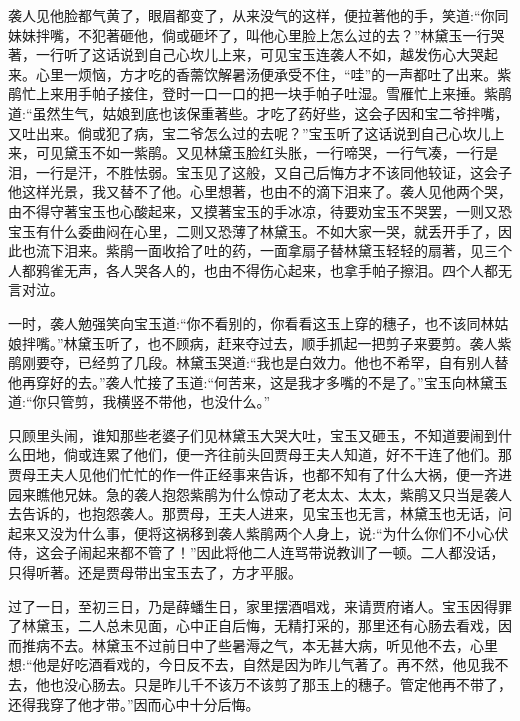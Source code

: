 \begin{parag}
    袭人见他脸都气黄了，眼眉都变了，从来没气的这样，便拉著他的手，笑道:“你同妹妹拌嘴，不犯著砸他，倘或砸坏了，叫他心里脸上怎么过的去？”林黛玉一行哭著，一行听了这话说到自己心坎儿上来，可见宝玉连袭人不如，越发伤心大哭起来。心里一烦恼，方才吃的香薷饮解暑汤便承受不住，“哇”的一声都吐了出来。紫鹃忙上来用手帕子接住，登时一口一口的把一块手帕子吐湿。雪雁忙上来捶。紫鹃道:“虽然生气，姑娘到底也该保重著些。才吃了药好些，这会子因和宝二爷拌嘴，又吐出来。倘或犯了病，宝二爷怎么过的去呢？”宝玉听了这话说到自己心坎儿上来，可见黛玉不如一紫鹃。又见林黛玉脸红头胀，一行啼哭，一行气凑，一行是泪，一行是汗，不胜怯弱。宝玉见了这般，又自己后悔方才不该同他较证，这会子他这样光景，我又替不了他。心里想著，也由不的滴下泪来了。袭人见他两个哭，由不得守著宝玉也心酸起来，又摸著宝玉的手冰凉，待要劝宝玉不哭罢，一则又恐宝玉有什么委曲闷在心里，二则又恐薄了林黛玉。不如大家一哭，就丢开手了，因此也流下泪来。紫鹃一面收拾了吐的药，一面拿扇子替林黛玉轻轻的扇著，见三个人都鸦雀无声，各人哭各人的，也由不得伤心起来，也拿手帕子擦泪。四个人都无言对泣。
\end{parag}


\begin{parag}
    一时，袭人勉强笑向宝玉道:“你不看别的，你看看这玉上穿的穗子，也不该同林姑娘拌嘴。”林黛玉听了，也不顾病，赶来夺过去，顺手抓起一把剪子来要剪。袭人紫鹃刚要夺，已经剪了几段。林黛玉哭道:“我也是白效力。他也不希罕，自有别人替他再穿好的去。”袭人忙接了玉道:“何苦来，这是我才多嘴的不是了。”宝玉向林黛玉道:“你只管剪，我横竖不带他，也没什么。”
\end{parag}


\begin{parag}
    只顾里头闹，谁知那些老婆子们见林黛玉大哭大吐，宝玉又砸玉，不知道要闹到什么田地，倘或连累了他们，便一齐往前头回贾母王夫人知道，好不干连了他们。那贾母王夫人见他们忙忙的作一件正经事来告诉，也都不知有了什么大祸，便一齐进园来瞧他兄妹。急的袭人抱怨紫鹃为什么惊动了老太太、太太，紫鹃又只当是袭人去告诉的，也抱怨袭人。那贾母，王夫人进来，见宝玉也无言，林黛玉也无话，问起来又没为什么事，便将这祸移到袭人紫鹃两个人身上，说:“为什么你们不小心伏侍，这会子闹起来都不管了！”因此将他二人连骂带说教训了一顿。二人都没话，只得听著。还是贾母带出宝玉去了，方才平服。
\end{parag}


\begin{parag}
    过了一日，至初三日，乃是薛蟠生日，家里摆酒唱戏，来请贾府诸人。宝玉因得罪了林黛玉，二人总未见面，心中正自后悔，无精打采的，那里还有心肠去看戏，因而推病不去。林黛玉不过前日中了些暑溽之气，本无甚大病，听见他不去，心里想:“他是好吃酒看戏的，今日反不去，自然是因为昨儿气著了。再不然，他见我不去，他也没心肠去。只是昨儿千不该万不该剪了那玉上的穗子。管定他再不带了，还得我穿了他才带。”因而心中十分后悔。
\end{parag}


